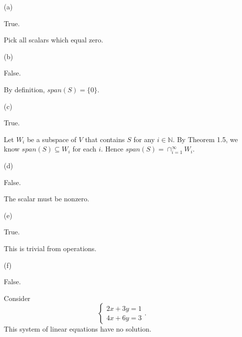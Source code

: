 \begin{Exercise}
	\begin{enumerate}[(a)]
		\item[(a)]
		\begin{answer}
			True.
		\end{answer}
		\begin{solution}
			Pick all scalars which equal zero. 
		\end{solution}
		
		\item[(b)]
		\begin{answer}
			False.
		\end{answer}
		\begin{solution}
			By definition, $span(S) = \{0\}$.
		\end{solution}
		
		\item[(c)]
		\begin{answer}
			True.
		\end{answer}
		\begin{solution}
			Let $W_i$ be a subspace of $V$ that contains $S$ for any $i\in\mathbb{N}$. By Theorem 1.5, we know $span(S)\subseteq W_i$ for each $i$. Hence $span(S) = \cap_{i=1}^{\infty}W_i$.
		\end{solution}
		
		\item[(d)]
		\begin{answer}
			False.
		\end{answer}
		\begin{solution}
			The scalar must be nonzero.
		\end{solution}
		
		\item[(e)]
		\begin{answer}
			True.
		\end{answer}
		\begin{solution}
			This is trivial from operations.
		\end{solution}
		
		\item[(f)]
		\begin{answer}
			False.
		\end{answer}
		\begin{solution}
			Consider 
			$$
			\begin{cases}
			2x + 3y = 1 \\
			4x + 6y = 3
			\end{cases}.
			$$
			This system of linear equations have no solution.
		\end{solution}
		
	\end{enumerate}
\end{Exercise}